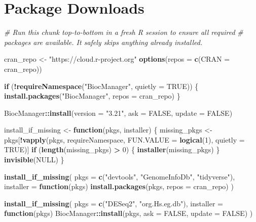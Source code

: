 \documentclass[
]{article}
\author{}
\date{\vspace{-2.5em}}
\newenvironment{Shaded}{\begin{snugshade}}{\end{snugshade}}
\newcommand{\AttributeTok}[1]{\textcolor[rgb]{0.13,0.29,0.53}{#1}}
\newcommand{\CommentTok}[1]{\textcolor[rgb]{0.56,0.35,0.01}{\textit{#1}}}
\newcommand{\ConstantTok}[1]{\textcolor[rgb]{0.56,0.35,0.01}{#1}}
\newcommand{\ControlFlowTok}[1]{\textcolor[rgb]{0.13,0.29,0.53}{\textbf{#1}}}
\newcommand{\DecValTok}[1]{\textcolor[rgb]{0.00,0.00,0.81}{#1}}
\newcommand{\FunctionTok}[1]{\textcolor[rgb]{0.13,0.29,0.53}{\textbf{#1}}}
\newcommand{\NormalTok}[1]{#1}
\newcommand{\OtherTok}[1]{\textcolor[rgb]{0.56,0.35,0.01}{#1}}
\newcommand{\SpecialCharTok}[1]{\textcolor[rgb]{0.81,0.36,0.00}{\textbf{#1}}}
\newcommand{\StringTok}[1]{\textcolor[rgb]{0.31,0.60,0.02}{#1}}
\begin{document}
\section{Package Downloads}\label{package-downloads}

\begin{Shaded}
\begin{Highlighting}[]
\CommentTok{\# Run this chunk top{-}to{-}bottom in a fresh R session to ensure all required}
\CommentTok{\# packages are available. It safely skips anything already installed.}

\NormalTok{cran\_repo }\OtherTok{\textless{}{-}} \StringTok{"https://cloud.r{-}project.org"}
\FunctionTok{options}\NormalTok{(}\AttributeTok{repos =} \FunctionTok{c}\NormalTok{(}\AttributeTok{CRAN =}\NormalTok{ cran\_repo))}

\ControlFlowTok{if}\NormalTok{ (}\SpecialCharTok{!}\FunctionTok{requireNamespace}\NormalTok{(}\StringTok{"BiocManager"}\NormalTok{, }\AttributeTok{quietly =} \ConstantTok{TRUE}\NormalTok{)) \{}
  \FunctionTok{install.packages}\NormalTok{(}\StringTok{"BiocManager"}\NormalTok{, }\AttributeTok{repos =}\NormalTok{ cran\_repo)}
\NormalTok{\}}

\NormalTok{BiocManager}\SpecialCharTok{::}\FunctionTok{install}\NormalTok{(}\AttributeTok{version =} \StringTok{"3.21"}\NormalTok{, }\AttributeTok{ask =} \ConstantTok{FALSE}\NormalTok{, }\AttributeTok{update =} \ConstantTok{FALSE}\NormalTok{)}

\NormalTok{install\_if\_missing }\OtherTok{\textless{}{-}} \ControlFlowTok{function}\NormalTok{(pkgs, installer) \{}
\NormalTok{  missing\_pkgs }\OtherTok{\textless{}{-}}\NormalTok{ pkgs[}\SpecialCharTok{!}\FunctionTok{vapply}\NormalTok{(pkgs, requireNamespace,}
                               \AttributeTok{FUN.VALUE =} \FunctionTok{logical}\NormalTok{(}\DecValTok{1}\NormalTok{), }\AttributeTok{quietly =} \ConstantTok{TRUE}\NormalTok{)]}
  \ControlFlowTok{if}\NormalTok{ (}\FunctionTok{length}\NormalTok{(missing\_pkgs) }\SpecialCharTok{\textgreater{}} \DecValTok{0}\NormalTok{) \{}
    \FunctionTok{installer}\NormalTok{(missing\_pkgs)}
\NormalTok{  \}}
  \FunctionTok{invisible}\NormalTok{(}\ConstantTok{NULL}\NormalTok{)}
\NormalTok{\}}

\FunctionTok{install\_if\_missing}\NormalTok{(}
  \AttributeTok{pkgs =} \FunctionTok{c}\NormalTok{(}\StringTok{"devtools"}\NormalTok{, }\StringTok{"GenomeInfoDb"}\NormalTok{, }\StringTok{"tidyverse"}\NormalTok{),}
  \AttributeTok{installer =} \ControlFlowTok{function}\NormalTok{(pkgs) }\FunctionTok{install.packages}\NormalTok{(pkgs, }\AttributeTok{repos =}\NormalTok{ cran\_repo)}
\NormalTok{)}

\FunctionTok{install\_if\_missing}\NormalTok{(}
  \AttributeTok{pkgs =} \FunctionTok{c}\NormalTok{(}\StringTok{"DESeq2"}\NormalTok{, }\StringTok{"org.Hs.eg.db"}\NormalTok{),}
  \AttributeTok{installer =} \ControlFlowTok{function}\NormalTok{(pkgs) BiocManager}\SpecialCharTok{::}\FunctionTok{install}\NormalTok{(pkgs, }\AttributeTok{ask =} \ConstantTok{FALSE}\NormalTok{, }\AttributeTok{update =} \ConstantTok{FALSE}\NormalTok{)}
\NormalTok{)}
\end{Highlighting}
\end{Shaded}
\end{document}
